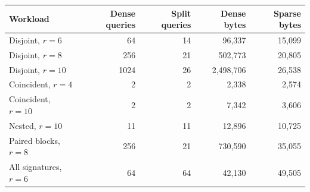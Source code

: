 \begin{tabular}{@{}lrrrr@{}}
\toprule
Workload & Dense queries & Split queries & Dense bytes & Sparse bytes\\
\midrule
Disjoint, $r=6$ & 64 & 14 & 96,337 & 15,099\\
Disjoint, $r=8$ & 256 & 21 & 502,773 & 20,805\\
Disjoint, $r=10$ & 1024 & 26 & 2,498,706 & 26,538\\
Coincident, $r=4$ & 2 & 2 & 2,338 & 2,574\\
Coincident, $r=10$ & 2 & 2 & 7,342 & 3,606\\
Nested, $r=10$ & 11 & 11 & 12,896 & 10,725\\
Paired blocks, $r=8$ & 256 & 21 & 730,590 & 35,055\\
All signatures, $r=6$ & 64 & 64 & 42,130 & 49,505\\
\bottomrule
\end{tabular}
